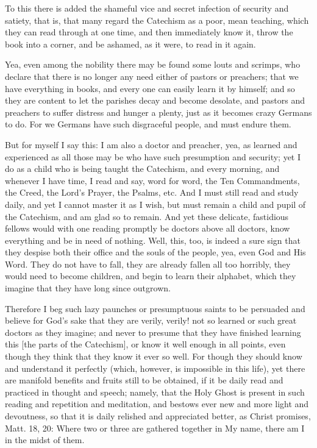 To this there is added the shameful vice and secret infection of
security and satiety, that is, that many regard the Catechism as a
poor, mean teaching, which they can read through at one time, and then
immediately know it, throw the book into a corner, and be ashamed, as
it were, to read in it again.

Yea, even among the nobility there may be found some louts and
scrimps, who declare that there is no longer any need either of
pastors or preachers; that we have everything in books, and every one
can easily learn it by himself; and so they are content to let the
parishes decay and become desolate, and pastors and preachers to suffer
distress and hunger a plenty, just as it becomes crazy Germans to do.
For we Germans have such disgraceful people, and must endure them.

But for myself I say this: I am also a doctor and preacher, yea, as
learned and experienced as all those may be who have such presumption
and security; yet I do as a child who is being taught the Catechism,
and every morning, and whenever I have time, I read and say, word for
word, the Ten Commandments, the Creed, the Lord's Prayer, the Psalms,
etc. And I must still read and study daily, and yet I cannot master it
as I wish, but must remain a child and pupil of the Catechism, and am
glad so to remain. And yet these delicate, fastidious fellows would
with one reading promptly be doctors above all doctors, know everything
and be in need of nothing. Well, this, too, is indeed a sure sign that
they despise both their office and the souls of the people, yea, even
God and His Word. They do not have to fall, they are already fallen all
too horribly, they would need to become children, and begin to learn
their alphabet, which they imagine that they have long since outgrown.

Therefore I beg such lazy paunches or presumptuous saints to be
persuaded and believe for God's sake that they are verily, verily! not
so learned or such great doctors as they imagine; and never to presume
that they have finished learning this [the parts of the Catechism], or
know it well enough in all points, even though they think that they
know it ever so well. For though they should know and understand it
perfectly (which, however, is impossible in this life), yet there are
manifold benefits and fruits still to be obtained, if it be daily read
and practiced in thought and speech; namely, that the Holy Ghost is
present in such reading and repetition and meditation, and bestows ever
new and more light and devoutness, so that it is daily relished and
appreciated better, as Christ promises, Matt. 18, 20: Where two or
three are gathered together in My name, there am I in the midst of
them.

